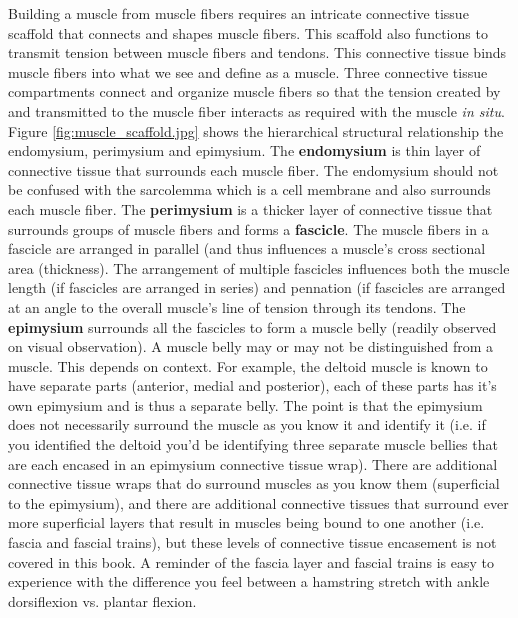 Building a muscle from muscle fibers requires an intricate connective tissue scaffold that connects and shapes muscle fibers. This scaffold also functions to transmit tension between muscle fibers and tendons.  This connective tissue binds muscle fibers into what we see and define as a muscle. Three connective tissue compartments connect and organize muscle fibers so that the tension created by and transmitted to the muscle fiber interacts as required with the muscle \textit{in situ}. Figure \ref{fig:muscle_scaffold.jpg} shows the hierarchical structural relationship the endomysium, perimysium and epimysium. The \textbf{endomysium} is thin layer of connective tissue that surrounds each muscle fiber. The endomysium should not be confused with the sarcolemma which is a cell membrane and also surrounds each muscle fiber. The \textbf{perimysium} is a thicker layer of connective tissue that surrounds groups of muscle fibers and forms a \textbf{fascicle}. The muscle fibers in a fascicle are arranged in parallel (and thus influences a muscle's cross sectional area (thickness). The arrangement of multiple fascicles influences both the muscle length (if fascicles are arranged in series) and pennation (if fascicles are arranged at an angle to the overall muscle's line of tension through its tendons. The \textbf{epimysium} surrounds all the fascicles to form a muscle belly (readily observed on visual observation). A muscle belly may or may not be distinguished from a muscle. This depends on context. For example, the deltoid muscle is known to have separate parts (anterior, medial and posterior), each of these parts has it's own epimysium and is thus a separate belly. The point is that the epimysium does not necessarily surround the muscle as you know it and identify it (i.e. if you identified the deltoid you'd be identifying three separate muscle bellies that are each encased in an epimysium connective tissue wrap). There are additional connective tissue wraps that do surround muscles as you know them (superficial to the epimysium), and there are additional connective tissues that surround ever more superficial layers that result in muscles being bound to one another (i.e. fascia and fascial trains), but these levels of connective tissue encasement is not covered in this book. A reminder of the fascia layer and fascial trains is easy to experience with the difference you feel between a hamstring stretch with ankle dorsiflexion vs. plantar flexion.

